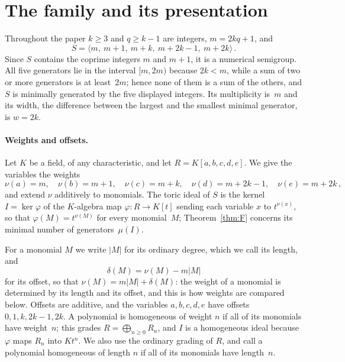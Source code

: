\documentclass[11pt,letterpaper]{article}
\numberwithin{equation}{section}
\theoremstyle{plain}
\theoremstyle{remark}
\newcommand{\len}[1]{\lvert #1\rvert}
\begin{document}
\section{The family and its presentation}\label{sec:family}

Throughout the paper $k\ge 3$ and $q\ge k-1$ are integers, $m=2kq+1$, and
\begin{equation}\label{eq:S}
S=\langle m,\ m+1,\ m+k,\ m+2k-1,\ m+2k\rangle\,.
\end{equation}
Since $S$ contains the coprime integers $m$ and $m+1$, it is a numerical semigroup. All five generators lie in the interval $[m,2m)$ because $2k<m$, while a sum of two or more generators is at least~$2m$; hence none of them is a sum of the others, and $S$ is minimally generated by the five displayed integers. Its multiplicity is~$m$ and its width, the difference between the largest and the smallest minimal generator, is $w=2k$.

\paragraph{Weights and offsets.}
Let $K$ be a field, of any characteristic, and let $R=K[a,b,c,d,e]$. We give the variables the weights
\begin{equation*}
\nu(a)=m,\quad \nu(b)=m+1,\quad \nu(c)=m+k,\quad \nu(d)=m+2k-1,\quad \nu(e)=m+2k\,,
\end{equation*}
and extend $\nu$ additively to monomials. The toric ideal of $S$ is the kernel $I=\ker\varphi$ of the $K$-algebra map $\varphi\colon R\to K[t]$ sending each variable $x$ to $t^{\nu(x)}$, so that $\varphi(M)=t^{\nu(M)}$ for every monomial~$M$; Theorem~\ref{thm:F} concerns its minimal number of generators~$\mu(I)$.

For a monomial $M$ we write $\len{M}$ for its ordinary degree, which we call its length, and
\begin{equation*}
\delta(M)=\nu(M)-m\len{M}
\end{equation*}
for its offset, so that $\nu(M)=m\len{M}+\delta(M)$: the weight of a monomial is determined by its length and its offset, and this is how weights are compared below. Offsets are additive, and the variables $a,b,c,d,e$ have offsets $0,1,k,2k-1,2k$. A polynomial is homogeneous of weight $n$ if all of its monomials have weight~$n$; this grades $R=\bigoplus_{n\ge 0}R_n$, and $I$ is a homogeneous ideal because $\varphi$ maps $R_n$ into $Kt^n$. We also use the ordinary grading of $R$, and call a polynomial homogeneous of length $n$ if all of its monomials have length~$n$.
\end{document}
